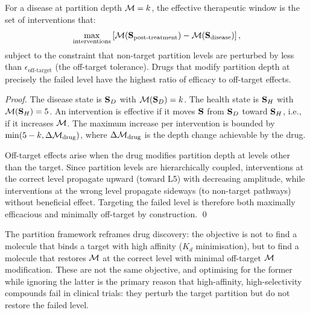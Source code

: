 \begin{proposition}
\label{prop:therapy_principle}
For a disease at partition depth $\mathcal{M} = k$, the effective therapeutic
window is the set of interventions that:
\begin{equation}
  \max_{\text{interventions}} \left[\mathcal{M}(\mathbf{S}_{\text{post-treatment}}) - \mathcal{M}(\mathbf{S}_{\text{disease}})\right],
\end{equation}
subject to the constraint that non-target partition levels are perturbed by
less than $\epsilon_{\text{off-target}}$ (the off-target tolerance).
Drugs that modify partition depth at precisely the failed level have the highest
ratio of efficacy to off-target effects.
\end{proposition}

\begin{proof}
The disease state is $\mathbf{S}_D$ with $\mathcal{M}(\mathbf{S}_D) = k$.
The health state is $\mathbf{S}_H$ with $\mathcal{M}(\mathbf{S}_H) = 5$.
An intervention is effective if it moves $\mathbf{S}$ from $\mathbf{S}_D$ toward
$\mathbf{S}_H$, i.e., if it increases $\mathcal{M}$. The maximum increase per
intervention is bounded by $\min(5 - k, \Delta\mathcal{M}_{\text{drug}})$, where
$\Delta\mathcal{M}_{\text{drug}}$ is the depth change achievable by the drug.

Off-target effects arise when the drug modifies partition depth at levels
other than the target. Since partition levels are hierarchically coupled,
interventions at the correct level propagate upward (toward L5) with
decreasing amplitude, while interventions at the wrong level propagate
sideways (to non-target pathways) without beneficial effect. Targeting the
failed level is therefore both maximally efficacious and minimally off-target
by construction. \qed
\end{proof}

\begin{remark}
The partition framework reframes drug discovery: the objective is not to find
a molecule that binds a target with high affinity ($K_d$ minimisation), but
to find a molecule that restores $\mathcal{M}$ at the correct level with minimal
off-target $\mathcal{M}$ modification. These are not the same objective, and
optimising for the former while ignoring the latter is the primary reason
that high-affinity, high-selectivity compounds fail in clinical trials:
they perturb the target partition but do not restore the failed level.
\end{remark}

